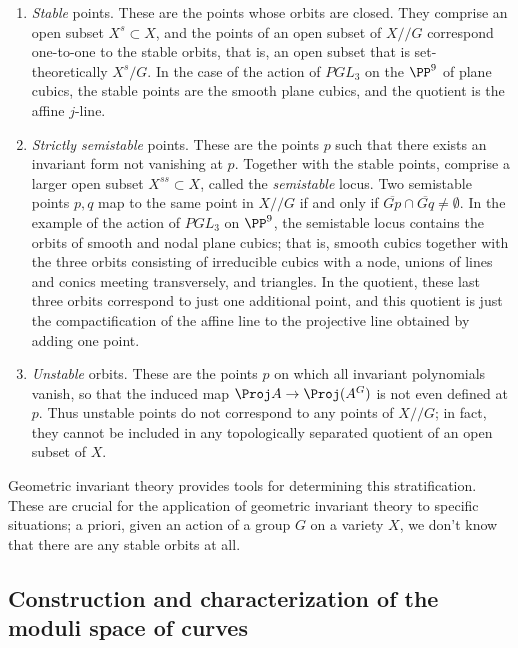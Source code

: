 \begin{enumerate}

\item  \emph{Stable} points. These are the points whose orbits are closed. They comprise an open subset $X^s \subset X$, and the points of an open subset of $X//G$ correspond one-to-one to the stable orbits, that is, an open subset that is set-theoretically $X^s/G$. In the case of the action of $PGL_3$ on the $\PP^9$ of plane cubics, the stable points are the smooth plane cubics, and the quotient is the affine $j$-line.

\item \emph{Strictly semistable} points. These are the points $p$ such that there exists an invariant form not vanishing at $p$.  Together with the stable points, comprise a larger open subset $X^{ss} \subset X$, called the \emph{semistable} locus. Two  semistable points $p,q$ map to the same point in $X//G$ if and only if $\overline{Gp}\cap \overline{Gq} \neq \emptyset$. In the example of the action of $PGL_3$ on  $\PP^9$, the semistable  locus contains  the orbits of smooth and nodal plane cubics; that is, smooth cubics together with the three orbits consisting of irreducible cubics with a node, unions of lines and conics meeting transversely, and triangles. In the quotient, these last three orbits correspond to just one additional point, and this quotient is just the compactification of the affine line to the projective line obtained by adding one point.

\item  \emph{Unstable} orbits. These are the points $p$ on which all invariant polynomials vanish, so that the induced map
$\Proj A \to \Proj (A^G)$ is not even defined at $p$. Thus unstable points do not correspond to any points of $X//G$; in fact, they cannot be included in any topologically separated quotient of an open subset of $X$.

\end{enumerate}

Geometric invariant theory provides tools for determining this stratification. These are crucial for the application of geometric invariant theory to specific situations; a  priori, given an action of a group $G$ on a variety $X$, we don't know that there are any stable orbits at all.

\subsection{Construction and characterization of the moduli space of curves}

